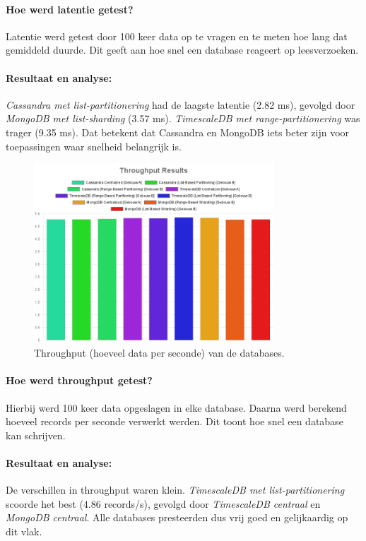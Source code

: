 \paragraph{Hoe werd latentie getest?}
Latentie werd getest door 100 keer data op te vragen en te meten hoe lang dat gemiddeld duurde. Dit geeft aan hoe snel een database reageert op leesverzoeken.

\paragraph{Resultaat en analyse:}
\textit{Cassandra met list-partitionering} had de laagste latentie (2.82 ms), gevolgd door \textit{MongoDB met list-sharding} (3.57 ms). \textit{TimescaleDB met range-partitionering} was trager (9.35 ms). Dat betekent dat Cassandra en MongoDB iets beter zijn voor toepassingen waar snelheid belangrijk is.

\begin{figure}[H]
	\centering
	\includegraphics[width=0.8\textwidth]{Throughput.png}
	\caption{Throughput (hoeveel data per seconde) van de databases.}
	\label{fig:throughput-comparison}
\end{figure}

\paragraph{Hoe werd throughput getest?}
Hierbij werd 100 keer data opgeslagen in elke database. Daarna werd berekend hoeveel records per seconde verwerkt werden. Dit toont hoe snel een database kan schrijven.

\paragraph{Resultaat en analyse:}
De verschillen in throughput waren klein. \textit{TimescaleDB met list-partitionering} scoorde het best (4.86 records/s), gevolgd door \textit{TimescaleDB centraal} en \textit{MongoDB centraal}. Alle databases presteerden dus vrij goed en gelijkaardig op dit vlak.

